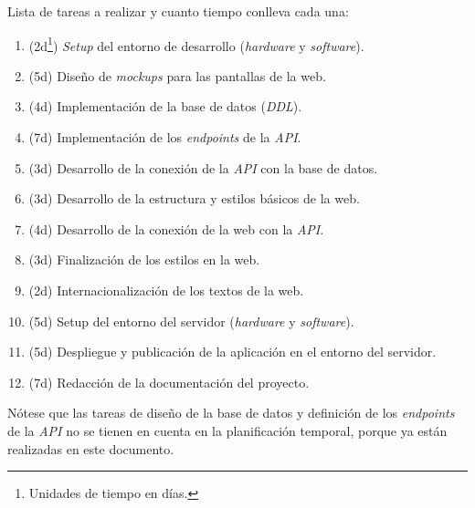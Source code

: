 \documentclass[12pt,a4paper,titlepage]{article}
\begin{document}

    Lista de tareas a realizar y cuanto tiempo conlleva cada una:

    \begin{enumerate}
        \renewcommand{\theenumi}{\Alph{enumi}} %
        \item (2d\footnote{Unidades de tiempo en días.}) \textit{Setup} del entorno de desarrollo (\textit{hardware} y \textit{software}).
        \item (5d) Diseño de \textit{mockups} para las pantallas de la web.
        \item (4d) Implementación de la base de datos (\textit{DDL}).
        \item (7d) Implementación de los \textit{endpoints} de la \textit{API}.
        \item (3d) Desarrollo de la conexión de la \textit{API} con la base de datos.
        \item (3d) Desarrollo de la estructura y estilos básicos de la web.
        \item (4d) Desarrollo de la conexión de la web con la \textit{API}.
        \item (3d) Finalización de los estilos en la web.
        \item (2d) Internacionalización de los textos de la web.
        \item (5d) Setup del entorno del servidor (\textit{hardware} y \textit{software}).
        \item (5d) Despliegue y publicación de la aplicación en el entorno del servidor.
        \item (7d) Redacción de la documentación del proyecto.
    \end{enumerate}

    Nótese que las tareas de diseño de la base de datos y definición de los \textit{endpoints} de la \textit{API} no se tienen en cuenta en la planificación temporal, porque ya están realizadas en este documento.

    
\end{document}
